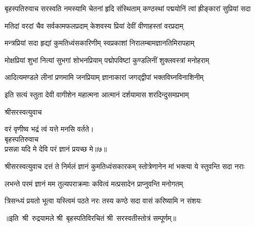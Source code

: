 
बृहस्पतिरुवाच\nopagebreak[4]
\twolineshloka
{सरस्वति नमस्यामि चेतनां हृदि संस्थिताम्}
{कण्ठस्थां पद्मयोनिं त्वां ह्रीङ्कारां सुप्रियां सदा}

\twolineshloka
{मतिदां वरदां चैव सर्वकामफलप्रदाम्}
{केशवस्य प्रियां देवीं वीणाहस्तां वरप्रदाम्}

\twolineshloka
{मन्त्रप्रियां सदा हृद्यां कुमतिध्वंसकारिणीम्}
{स्वप्रकाशां निरालम्बामज्ञानतिमिरापहाम्}

\twolineshloka
{मोक्षप्रियां शुभां नित्यां सुभगां शोभनप्रियाम्}
{पद्मोपविष्टां कुण्डलिनीं शुक्लवस्त्रां मनोहराम्}

\twolineshloka
{आदित्यमण्डले लीनां प्रणमामि जनप्रियाम्}
{ज्ञानाकारां जगद्द्वीपां भक्तविघ्नविनाशिनीम्}

\twolineshloka
{इति सत्यं स्तुता देवी वागीशेन महात्मना}
{आत्मानं दर्शयामास शरदिन्दुसमप्रभाम्}

\centerline{श्रीसरस्वत्युवाच}\nopagebreak[4]
वरं वृणीष्व भद्रं त्वं यत्ते मनसि वर्तते।\\
बृहस्पतिरुवाच\\
प्रसन्ना यदि मे देवि परं ज्ञानं प्रयच्छ मे॥७॥\\

श्रीसरस्वत्युवाच\nopagebreak[4]
\twolineshloka
{दत्तं ते निर्मलं ज्ञानं कुमतिध्वंसकारकम्}
{स्तोत्रेणानेन मां भक्त्या ये स्तुवन्ति सदा नराः}

\twolineshloka
{लभन्ते परमं ज्ञानं मम तुल्यपराक्रमाः}
{कवित्वं मत्प्रसादेन प्राप्नुवन्ति मनोगतम्}

\twolineshloka
{त्रिसन्ध्यं प्रयतो भूत्वा यस्त्विमं पठते नरः}
{तस्य कण्ठे सदा वासं करिष्यामि न संशयः}

॥इति~श्री~रुद्रयामले श्री~बृहस्पतिविरचितं श्री~सरस्वतीस्तोत्रं सम्पूर्णम्॥
